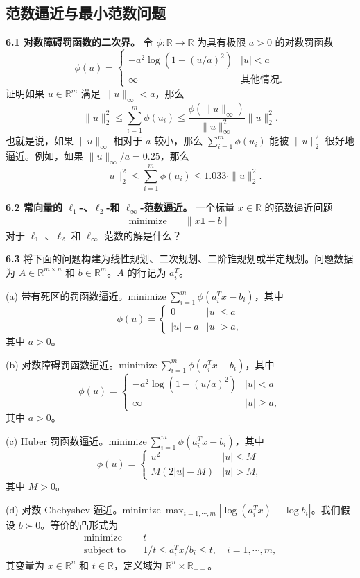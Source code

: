 \documentclass[UTF8, 12pt, fontset=fandol, oneside]{ctexart}
\begin{document}
\subsection*{范数逼近与最小范数问题}

\noindent\textbf{6.1 对数障碍罚函数的二次界。}\quad
令 $\phi:\mathbb{R}\to\mathbb{R}$ 为具有极限 $a>0$ 的对数罚函数
\[
\phi(u)=
\begin{cases}
-a^2\log(1-(u/a)^2) & |u|<a\\
\infty & \text{其他情况}.
\end{cases}
\]
证明如果 $u\in\mathbb{R}^m$ 满足 $\|u\|_\infty<a$，那么
\[
\|u\|_2^2\leq \sum_{i=1}^m\phi(u_i)\leq
\frac{\phi(\|u\|_\infty)}{\|u\|_\infty^2}\|u\|_2^2.
\]
也就是说，如果 $\|u\|_\infty$ 相对于 $a$ 较小，那么 $\sum_{i=1}^m\phi(u_i)$ 能被 $\|u\|_2^2$ 很好地逼近。例如，如果 $\|u\|_\infty/a=0.25$，那么
\[
\|u\|_2^2\leq \sum_{i=1}^m\phi(u_i)\leq 1.033\cdot \|u\|_2^2.
\]

\noindent\textbf{6.2 常向量的 $\ell_1$-、$\ell_2$-和 $\ell_\infty$-范数逼近。}\quad
一个标量 $x\in\mathbb{R}$ 的范数逼近问题
\[
\begin{aligned}
\text{minimize}\quad & \|x\mathbf{1}-b\|
\end{aligned}
\]
对于 $\ell_1$-、$\ell_2$-和 $\ell_\infty$-范数的解是什么？

\noindent\textbf{6.3}\quad
将下面的问题构建为线性规划、二次规划、二阶锥规划或半定规划。问题数据为 $A\in\mathbb{R}^{m\times n}$ 和 $b\in\mathbb{R}^m$。$A$ 的行记为 $a_i^T$。

(a) 带有死区的罚函数逼近。$\text{minimize}\ \sum_{i=1}^m\phi(a_i^Tx-b_i)$，其中
\[
\phi(u)=
\begin{cases}
0 & |u|\leq a\\
|u|-a & |u|>a,
\end{cases}
\]
其中 $a>0$。

(b) 对数障碍罚函数逼近。$\text{minimize}\ \sum_{i=1}^m\phi(a_i^Tx-b_i)$，其中
\[
\phi(u)=
\begin{cases}
-a^2\log(1-(u/a)^2) & |u|<a\\
\infty & |u|\geq a,
\end{cases}
\]
其中 $a>0$。

(c) Huber 罚函数逼近。$\text{minimize}\ \sum_{i=1}^m\phi(a_i^Tx-b_i)$，其中
\[
\phi(u)=
\begin{cases}
u^2 & |u|\leq M\\
M(2|u|-M) & |u|>M,
\end{cases}
\]
其中 $M>0$。

(d) 对数-Chebyshev 逼近。$\text{minimize}\ \max_{i=1,\cdots,m}|\log(a_i^Tx)-\log b_i|$。我们假设 $b\succ 0$。等价的凸形式为
\[
\begin{aligned}
\text{minimize}\quad & t\\
\text{subject to}\quad & 1/t\leq a_i^Tx/b_i\leq t,\quad i=1,\cdots,m,
\end{aligned}
\]
其变量为 $x\in\mathbb{R}^n$ 和 $t\in\mathbb{R}$，定义域为 $\mathbb{R}^n\times\mathbb{R}_{++}$。
\end{document}
